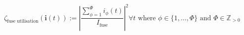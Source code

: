 \begin{equation}
	\zeta_\text{fuse utilisation}(\textbf{i}(t)) :=%
	\left|\frac{\sum_{\phi=1}^{\Phi}{i_\phi(t)}}{I_\text{fuse}}\right|^2 \forall t%
	\text{ where } \phi \in \{1, \dots, \Phi\}%
	\text{ and } \Phi \in \mathbb{Z}_{>0}
	\label{ch1:equ:fuse-utilisation}
\end{equation}